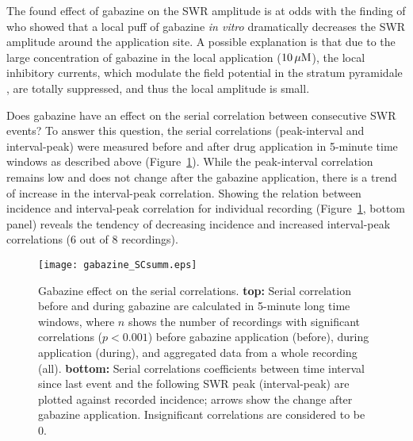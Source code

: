     The found effect of gabazine on the SWR amplitude is at odds with the
    finding of \cite{Schlingloff2014} who showed that a local puff of gabazine
    \textit{in vitro} dramatically decreases the SWR amplitude around the
    application site. A possible explanation is that due to the large
    concentration of gabazine in the local application ($10\,\rm \mu M$), the
    local inhibitory currents, which modulate the field potential in the
    stratum pyramidale \citep{Schonberger2014}, are totally suppressed, and
    thus the local amplitude is small.
    
    Does gabazine have an effect on the serial correlation between consecutive
    SWR events? To answer this question, the serial correlations (peak-interval
    and interval-peak) were measured before and after drug application in
    5-minute time windows as described above
    (Figure~\ref{fig:gabazine_SCsumm}). While the peak-interval correlation
    remains low and does not change after the gabazine application, there is a
    trend of increase in the interval-peak correlation. Showing the relation
    between incidence and interval-peak correlation for individual recording
    (Figure~\ref{fig:gabazine_SCsumm}, bottom panel) reveals the tendency of
    decreasing incidence and increased interval-peak correlations (6 out of 8
    recordings).

    \begin{figure}
      \center
      \texttt{[image: gabazine\_SCsumm.eps]}
      \caption{
        Gabazine effect on the serial correlations. \textbf{top:} Serial
        correlation before and during gabazine are calculated in 5-minute long
        time windows, where $n$ shows the number of recordings with significant
        correlations ($p<0.001$) before gabazine application (before), during
        application (during), and aggregated data from a whole recording (all).
        \textbf{bottom:} Serial correlations coefficients between time interval
        since last event and the following SWR peak (interval-peak) are plotted
        against recorded incidence; arrows show the change after gabazine
        application. Insignificant correlations are considered to be 0.
             }
    \label{fig:gabazine_SCsumm}
    \end{figure}

